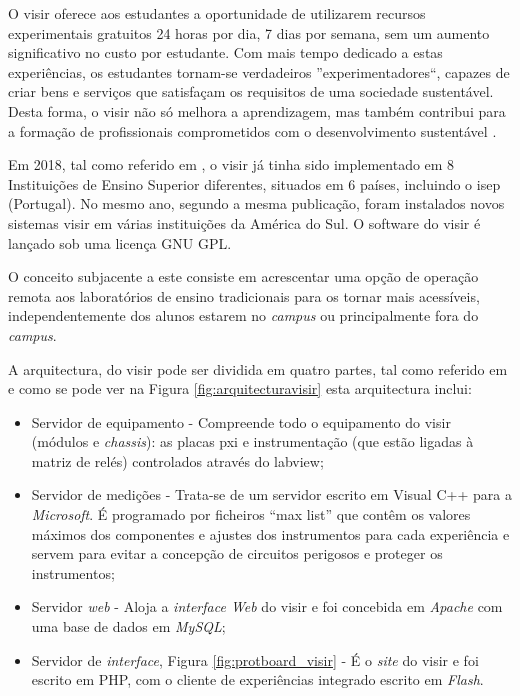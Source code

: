 O \acrshort{visir} oferece aos estudantes a oportunidade de utilizarem recursos experimentais gratuitos 24 horas por dia, 7 dias por semana, sem um aumento significativo no custo por estudante. Com mais tempo dedicado a estas experiências, os estudantes tornam-se verdadeiros ''experimentadores``, capazes de criar bens e serviços que satisfaçam os requisitos de uma sociedade sustentável. Desta forma, o \acrshort{visir} não só melhora a aprendizagem, mas também contribui para a formação de profissionais comprometidos com o desenvolvimento sustentável \cite{OpenLabs77:online}.

Em 2018, tal como referido em \cite{PILARFederationVISIR}, o \acrshort{visir} já tinha sido implementado em 8 Instituições de Ensino Superior diferentes, situados em 6 países, incluindo o \acrshort{isep} (Portugal). No mesmo ano, segundo a mesma publicação, foram instalados novos sistemas \acrshort{visir} em várias instituições da América do Sul. O software do \acrshort{visir} é lançado sob uma licença GNU GPL.

O conceito subjacente a este consiste em acrescentar uma opção de operação remota aos laboratórios de ensino tradicionais para os tornar mais acessíveis, independentemente dos alunos estarem no \textit{campus} ou principalmente fora do \textit{campus}\cite{TheVISIRproject}.

A arquitectura, do \acrshort{visir} pode ser dividida em quatro partes, tal como referido em \cite{tawfikexperiences} e como se pode ver na Figura \ref{fig:arquitecturavisir} esta arquitectura inclui:
\begin{itemize}
    \item Servidor de equipamento - Compreende todo o equipamento do \acrshort{visir} (módulos e \textit{chassis}): as placas \acrfull{pxi} e instrumentação (que estão ligadas à matriz de relés) controlados através do \acrshort{labview};
    \item Servidor de medições - Trata-se de um servidor escrito em Visual C++ para a \textit{Microsoft}. É programado por ficheiros ``max list'' que contêm os valores máximos dos componentes e ajustes dos instrumentos para cada experiência e servem para evitar a concepção de circuitos perigosos e proteger os instrumentos;
    \item Servidor \textit{web} - Aloja a \textit{interface Web} do \acrshort{visir} e foi concebida em \textit{Apache} com uma base de dados em \textit{MySQL};
    \item Servidor de \textit{interface}, Figura \ref{fig:protboard_visir} - É o \textit{site} do \acrshort{visir} e foi escrito em PHP, com o cliente de experiências integrado escrito em \textit{Flash}.
\end{itemize}

